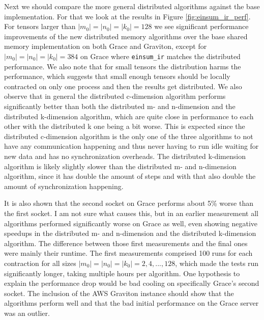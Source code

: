 Next we should compare the more general distributed algorithms against the base implementation.
For that we look at the results in Figure \ref{fig:einsum_ir_perf}.
For tensors larger than $|m_0|=|n_0|=|k_0|=128$ we see significant performance improvements of the new distributed memory algorithms over the base shared memory implementation on both Grace and Graviton, except for $|m_0|=|n_0|=|k_0|=384$ on Grace where \texttt{einsum\_ir} matches the distributed performance.
We also note that for small tensors the distribution harms the performance, which suggests that small enough tensors should be locally contracted on only one process and then the results get distributed.
We also observe that in general the distributed c-dimension algorithm performs significantly better than both the distributed m- and n-dimension and the distributed k-dimension algorithm, which are quite close in performance to each other with the distributed k one being a bit worse.
This is expected since the distributed c-dimension algorithm is the only one of the three algorithms to not have any communication happening and thus never having to run idle waiting for new data and has no synchronization overheads.
The distributed k-dimension algorithm is likely slightly slower than the distributed m- and n-dimension algorithm, since it has double the amount of steps and with that also double the amount of synchronization happening.

It is also shown that the second socket on Grace performs about 5\% worse than the first socket.
I am not sure what causes this, but in an earlier measurement all algorithms performed significantly worse on Grace as well, even showing negative speedups in the distributed m- and n-dimension and the distributed k-dimension algorithm.
The difference between those first measurements and the final ones were mainly their runtime.
The first measurements comprised 100 runs for each contraction for all sizes $|m_0|=|n_0|=|k_0|=2,4,...,128$, which made the tests run significantly longer, taking multiple hours per algorithm.
One hypothesis to explain the performance drop would be bad cooling on specifically Grace's second socket.
The inclusion of the AWS Graviton instance should show that the algorithms perform well and that the bad initial performance on the Grace server was an outlier.


